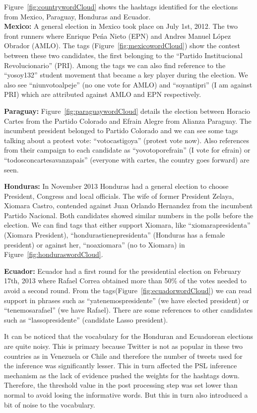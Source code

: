 Figure~\ref{fig:countrywordCloud} shows the hashtags identified for the elections from Mexico, Paraguay, Honduras and Ecuador.\\
\noindent	
{\bf Mexico:} A general election in Mexico took place on July 1st, 2012.
The two front runners where Enrique Pe\'{n}a Nieto (EPN) and Andres Manuel L\'{o}pez Obrador (AMLO).
The tags (Figure~\ref{fig:mexicowordCloud}) show the contest between these two candidates, the first belonging to the “Partido Institucional Revolucionario” (PRI). 
Among the tags we can also find reference to the “yosoy132” student movement that became a key player during the election. 
We also see “niunvotoalpeje” (no one vote for AMLO) and “soyantipri” (I am against PRI) which are attributed against AMLO and EPN respectively.

\noindent
{\bf Paraguay:}
Figure~\ref{fig:paraguaywordCloud} details the election between Horacio Cartes from the Partido Colorado and Efrain Alegre from Alianza Paraguay. 
The incumbent president belonged to Partido Colorado and we can see some tags talking about a protest vote: “votocastigoya” (protest vote now). 
Also references from their campaign to each candidate as “yovotoporefrain” (I vote for efrain) or “todosconcartesavanzapais” (everyone with cartes, the country goes forward) are seen.

\noindent
{\bf Honduras:}
In November 2013 Honduras had a general election to choose President, Congress and local officials. 
The wife of former President Zelaya, Xiomara Castro, contended against Juan Orlando Hernandez from the incumbent Partido Nacional. 
Both candidates showed similar numbers in the polls before the election. 
We can find tags that either support Xiomara, like “xiomarapresidenta” (Xiomara President), “hondurastienepresidenta” (Honduras has a female president) or against her, “noaxiomara” (no to Xiomara) in Figure~\ref{fig:honduraswordCloud}.

\noindent
{\bf Ecuador:}
Ecuador had a first round for the presidential election on February 17th, 2013 where Rafael Correa obtained more than 50\% of the votes needed to avoid a second round. 
From the tags(Figure~\ref{fig:ecuadorwordCloud}) we can read support in phrases such as “yatenemospresidente” (we have elected president) or “tenemosarafael” (we have Rafael). 
There are some references to other candidates such as “lassopresidente” (candidate Lasso president).

It can be noticed that the vocabulary for the Honduran and Ecuadorean  elections are quite noisy. 
This is primary because Twitter is not as popular in these two countries as in Venezuela or Chile and therefore the number of tweets
used for the inference was significantly lesser.
This in turn affected the PSL inference mechanism as the lack of evidence pushed the weights for the hashtags down.
Therefore, the threshold value in the post processing step was set lower than normal to avoid losing the informative words.
But this in turn also introduced a bit of noise to the vocabulary.